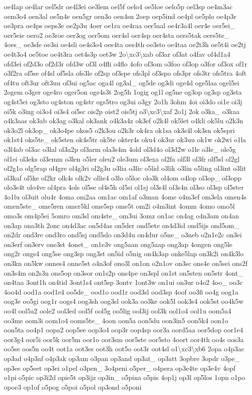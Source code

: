 {oe4lap oe4lar oel5dr oe4l3ei oe3lem oel5f oelo4 oe5loe oelo5p oel3sp oe4m3ac oem3o4 oen3al oe5n4e oen5gr oen3o oen4sn 2oep oep5ind oe4pl oe5plo oe4p3r oe3pra oe4ps oeps3e oe2p3u 4oer oe1ra oe4raa oer5aal oe4r3a4l oer4e oer5ei\-\_\- oer5eie oero2 oe3roe oer3og oer5om oer4sl oer4sp oer4sta oers5tak oers5te\-\_\- 4oes\-\_\- oe3sfe oe3si oe4sli oe4s3o4 oes4ta oes4th oe3sto oe4taa oe2t3h oe5t4i oe2tj oe4t3o4 oe5toe oe4t3ra oet4s3p oet3w 2o\textbackslash{}xc3\textbackslash{}xab of3ar of3at o4fav of4d1a4 ofd3ei of2d3o of2d3r ofd3w of3l o4fli o4flo 4ofo of3om o3foo of3op o3for of3ox of1r o3f2ra of5se of4sl of5sla ofs3le of2sp of3spe ofs3pl of3spo ofs3pr ofs3tr ofs5tra 4oft of4tu oft3ur oft3uu of3ui og5ac oga4l og3al\-\_\- og5de og3di oge4d oge5laa ogel5ei 2ogem o3ger oge4ro oger5on oge4s3t 2og5h 1ogig og1l og5ne og3op og3sp og3sta og4st5ei og3sto og4ston og4str ogs5tro og3ui o3gy 2o1h 3ohm 4oi oi3do oi1e oi3j oi5k o3ing oi3o4 oi3s4 oi5sc ois2p oist2 ois5tj o3\textbackslash{}xc3\textbackslash{}xaf 2o1j 2ok o3ka\-\_\- o3kaa o4k3aas ok3ab ok3ag o3kal ok3ank o4k3a4z ok3ef o2k4l ok5let o4kli ok5lu o2k3n ok3o2l ok3op\-\_\- ok3o4pe okos5 o2k3ou o2k3r ok4ra ok1sa ok3s4l ok3sn ok5spri ok1st4 oks5te\-\_\- ok5sten ok4s5tr ok5te okter4s oku4 ok3ur ok3uu ok1w ok2wi o1la o3l4ab ol3ac o3lal ol3a2p ol3arm ola3s4m 4old ol3d4o ol3d2w o1le o3le\-\_\- ole5g ol1ei ol3eks ol3emm o3len o5ler oleu2 ole3um ol3exa ol2fa olf3l ol3fr olf5sl ol2gl ol2g1o olg5rap ol4gre ol4g3ri ol2g3u o3lia o3lic o5lid o3lik o3lin o5ling ol3int o3lit ol3kaf ol5ke ol2kr olk4s olk2v ollie4 o3lo o5loc olo3k ol4om o4lop ol3op\-\_\- ol3opp olo3s4t olo4ve ol4pra 4ols ol5se ol4s5h ol5si ol1sj ol3s4l ol3s4n ol3so ol3sp ol5ster 4o1lu ol3uit olu4r 4oma om2aa om1ac om1af o3man 4ome o4m3ef om3ela omen4s omen5ste\-\_\- ome5ren omer5kl ome5sp ome5t om2i o4m3int 4omm 4omo omo5l omo3s om4p5ei 5omro om3sl om4ste\-\_\- om3ui 3omz on1ac on4ag o4n3am on4an on3ap ona3th 2onc on4d3ac on5d4as on5der ond5ete on4d3id ond5ijs ond5om\-\_\- on2dr ond3re ond3ro ond5sj ond5slo on3d4u on4dur o5ne\-\_\- o3neb o2n1e2c on3ei on3erf on3erv one3st 4onet\-\_\- on1e3v ong5aan ong5aap ong3ap 4ongen ong5le ong2r ongs4 ong5se ong3sp ong3st on5id o5nig on4k3ap onke5lap on3k2i on4k3lo on3kn on5kw onnes4 onne5st o4n3of ono3l on1on o2n1ov on3sc ons4e on5sei ons2f on3s4m on2s3n ons5op on3sor on1s2p ons4pe on3spl on1st on5sten on5str 4ont\-\_\- on4taa 3ont1h on4tid 3ont1s4 ont5sp 3ontv 1ont3w on1ui on3ur o4o2 4oo\-\_\- oo3c 4oo4d ood1a ood1e4 oo5de\-\_\- ood1o ood1r ood3sl ood3sp 4oof oo3fi oo4g oog1a oog3e oo5gi oog1r oogs4 oog3sh oog3sl ook3a oo3ke ook5l ook3s4 ook5st oo4k5w oo4l ool5a2 oole2 ool3ed ool5f ool5g oo5lig ool3ij ool3k ool1o4 ool1u oom5a4 oo3me oom3i oom1o4 ooms5te\-\_\- 4oon oon5a oon5du oon3in5 oon5k4 oon1o oon5ta oo4p1 oopa2 oop5ee oop3o4 oop3r oop4sp oor3a oord5aa oor5dop oor1e4 oor3g4 oor5i oor5k oor5m oor1o oor3sm oor5ste oor5sto 4oort oor4th oo4s oos3a oo5se oos5n oo4t oot1a oot3es oot3h oot5o oot3r oot4sl o1\textbackslash{}xc3\textbackslash{}xb6 2opa o4p3ac op3ad o4p3af o4p3ak op3am o3pan op3and op3at\-\_\- op3att 3opbre 3opdr o3pe\-\_\- op3ee op5eet op3ei o1pel o3pen\-\_\- 3o4peni o5per\-\_\- o4pera op3e4te op3e4v 4opf o1pi o5pic op3i2d opie5t op3ijz op3in\-\_\- o5pina o5pis 4op1j op3l op5los 1opn o1po opoe3 op1of o5pog o5poi o5pol op3ond o5poni }
